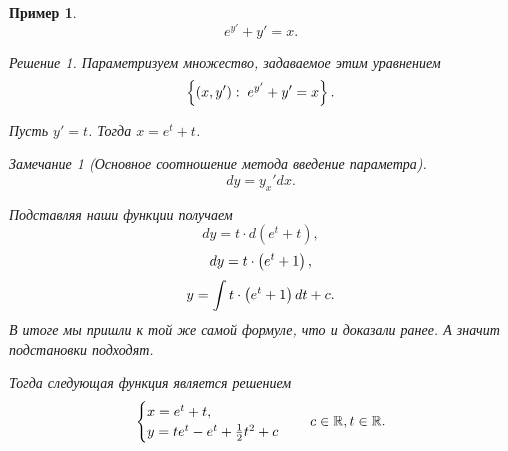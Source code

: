 \documentclass[a5paper, 10pt]{article}
\theoremstyle{definition}
\theoremstyle{plain}
\newtheorem{Ex}{Пример}
\theoremstyle{remark}
\newtheorem*{Note}{Замечание}
\newtheorem*{Solution}{Решение}
\begin{document}
	\begin{Ex}
		\[e^{y'} + y' = x.\]
		\begin{Solution}
			Параметризуем множество, задаваемое этим уравнением \[\left\{\left(x,y'\right) :\; e^{y'} + y' = x\right\}.\]
			
			Пусть $y'=t$. Тогда $x = e^t + t$.
			\begin{figure}[h!]
				\centering
			\caption{}
			\end{figure}
		\begin{Note}[Основное соотношение метода введение параметра]
			\[
			dy=y_x'dx.
			\]
		\end{Note}
		Подставляя наши функции получаем
		\[
		dy = t \cdot d(e^t+t),
		\]
		\[
		dy = t \cdot \left(e^t+1\right),
		\]
		\[
		y = \int t\cdot \left(e^t+1\right) dt + c.
		\]
		В итоге мы пришли к той же самой формуле, что и доказали ранее. А значит подстановки подходят.
		
		Тогда следующая функция является решением
		\[
		\begin{cases}
			x= e^t+t,\\
			y = te^t-e^t+\frac12 t^2 + c
		\end{cases}
		\quad c\in \mathbb{R}, t \in \mathbb{R}.
		\]
		\end{Solution}
	\end{Ex}
	
\end{document}
